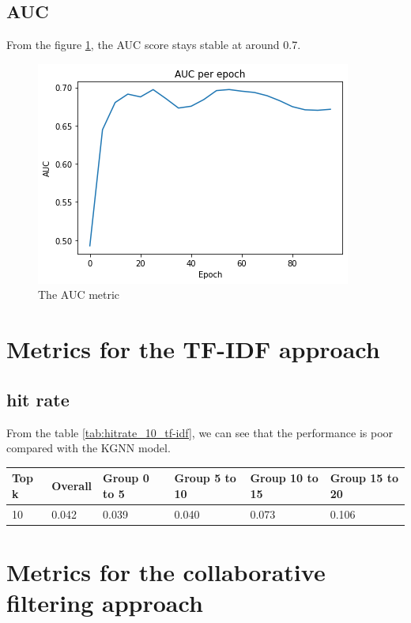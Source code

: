 \documentclass[11pt,twoside]{report}
\begin{document}
\subsection{AUC}
From the figure \ref{fig:auc}, the AUC score stays stable at around 0.7.

\begin{figure}[H]
    \centering
    \includegraphics[scale=0.9]{auc.png}
    \caption{The AUC metric}
    \label{fig:auc}
\end{figure}

\section{Metrics for the TF-IDF approach}
\subsection{hit rate}
From the table \ref{tab:hitrate_10_tf-idf}, we can see that the performance is poor compared with the KGNN model.

\begin{center}
    \begin{tabular}{| l | l | l | l | l | l |}
    \hline
    Top k & Overall & Group 0 to 5 & Group 5 to 10 & Group 10 to 15 & Group 15 to 20 \\ \hline
    10 & 0.042 & 0.039 & 0.040 & 0.073 & 0.106 \\ \hline
    \end{tabular}
    \label{tab:hitrate_10_tf-idf}
\end{center}

\section{Metrics for the collaborative filtering approach}
\end{document}
